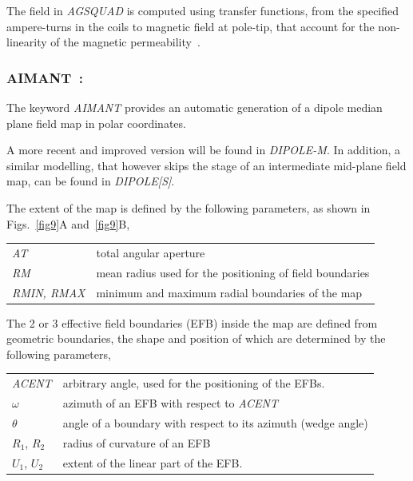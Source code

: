 \bigskip

\noindent The field in \textsl{AGSQUAD} is computed using transfer functions, from the specified ampere-turns in the coils to 
magnetic field at pole-tip, that  account for the non-linearity of the magnetic permeability~\cite{MADXAGSModel}. 



\newpage



\subsubsection*{AIMANT~:  \AIMANTTitl}\label{AIMANT}
\medskip

The keyword \textsl{AIMANT} provides an automatic
generation of a dipole median plane field map in polar coordinates. 

\medskip
\noindent A more recent and improved version will be 
found in \textsl{DIPOLE-M}. In addition, a similar modelling, that however skips 
the stage of an intermediate mid-plane field map, can be found in  \textsl{DIPOLE[S]}.

\medskip
\noindent The extent of the map is defined by the 
following parameters, as shown in Figs.~\ref{fig9}A and~\ref{fig9}B, 

 \begin{tabular}{>{\sl}l!{~:}l}
	 AT &  total angular aperture\\
	 RM & mean radius used for the positioning of field boundaries\\
	 RMIN, RMAX
	    &  minimum and maximum radial boundaries of the map 
 \end{tabular}
\bigskip

\noindent The 2 or 3 effective field boundaries (EFB) inside the map are
defined from  geometric boundaries, the shape and position of which are determined by the 
following parameters, 


\begin{tabular}{l!{~:}l}
	 \textsl{ACENT} 
	    & arbitrary  angle, used for the positioning of the EFBs. \\
	$\omega$ &  azimuth of an EFB with respect to  \textsl{ACENT}\\
	$\theta$ & angle of a boundary with respect to its azimuth (wedge angle)\\ 
	$R_1$, $R_2$  &  radius of curvature of an EFB\\
	$U_1$, $U_2$  &  extent of the linear part of the EFB. 
\end{tabular}
\bigskip

